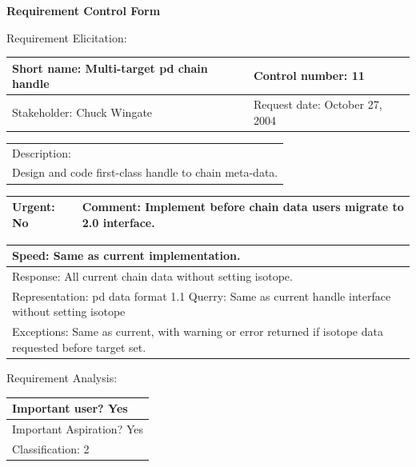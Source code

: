 \begin{center}\Large\bf
Requirement Control Form
\end{center}
\vspace{24pt}

Requirement Elicitation:

\begin{tabular}{|p{211pt}|p{211pt}|} \hline
Short name: Multi-target pd chain handle & Control number: 11\\ \hline
Stakeholder: Chuck Wingate & Request date: October 27, 2004\\
\end{tabular}
\begin{tabular}{|p{433pt}|} \hline
Description: \\ 
Design and code first-class handle to chain meta-data. \\
\hline
\end{tabular} 
\begin{tabular}{|p{211pt}|p{211pt}|} \hline
Urgent: No & Comment: Implement before chain data users migrate to 2.0
interface.\\ \hline
\end{tabular}

\vspace{12pt}

\begin{tabular}{|p{433pt}|} \hline
Speed: Same as current implementation. \\ \hline
Response: All current chain data without setting isotope. \\ \hline
Representation: pd data format 1.1 
Querry: Same as current handle interface without setting isotope \\ \hline
Exceptions: Same as current, with warning or error returned if isotope
data requested before target set. \\ \hline
\end{tabular}
\vspace{24pt}

Requirement Analysis:

\begin{tabular}{|p{433pt}|} \hline
Important user? Yes \\ \hline
Important Aspiration? Yes \\ \hline
Classification: 2 \\ \hline
\end{tabular}
\vspace{24pt}
